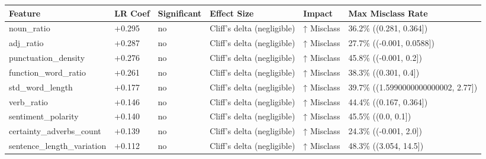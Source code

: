 \begin{tabular}{llllll}
\toprule
Feature & LR Coef & Significant & Effect Size & Impact & Max Misclass Rate \\
\midrule
noun\_ratio & +0.295 & no & Cliff's delta (negligible) & ↑ Misclass & 36.2\% ((0.281, 0.364]) \\
adj\_ratio & +0.287 & no & Cliff's delta (negligible) & ↑ Misclass & 27.7\% ((-0.001, 0.0588]) \\
punctuation\_density & +0.276 & no & Cliff's delta (negligible) & ↑ Misclass & 45.8\% ((-0.001, 0.2]) \\
function\_word\_ratio & +0.261 & no & Cliff's delta (negligible) & ↑ Misclass & 38.3\% ((0.301, 0.4]) \\
std\_word\_length & +0.177 & no & Cliff's delta (negligible) & ↑ Misclass & 39.7\% ((1.5990000000000002, 2.77]) \\
verb\_ratio & +0.146 & no & Cliff's delta (negligible) & ↑ Misclass & 44.4\% ((0.167, 0.364]) \\
sentiment\_polarity & +0.140 & no & Cliff's delta (negligible) & ↑ Misclass & 45.5\% ((0.0, 0.1]) \\
certainty\_adverbs\_count & +0.139 & no & Cliff's delta (negligible) & ↑ Misclass & 24.3\% ((-0.001, 2.0]) \\
sentence\_length\_variation & +0.112 & no & Cliff's delta (negligible) & ↑ Misclass & 48.3\% ((3.054, 14.5]) \\
\bottomrule
\end{tabular}
